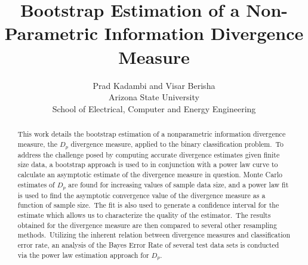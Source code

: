 \documentclass{article}
\begin{document}
	
	\title{Bootstrap Estimation of a Non-Parametric Information Divergence Measure}
	\author { Prad Kadambi and Visar Berisha \\
		\small Arizona State University \\
		\small School of Electrical, Computer and Energy Engineering}
	\date{}
	\maketitle
	
	\begin{abstract}
		
		This work details the bootstrap estimation of a nonparametric information divergence measure, the $D_p$ divergence measure, applied to the binary classification problem.\ To address the challenge posed by computing accurate divergence estimates given finite size data, a bootstrap approach is used to in conjunction with a power law curve to calculate an asymptotic estimate of the divergence measure in question. Monte Carlo estimates of $D_p$ are found for increasing values of sample data size, and a power law fit is used to find the asymptotic convergence value of the divergence measure as a function of sample size.\ The fit is also used to generate a confidence interval for the estimate which allows us to characterize the quality of the estimator.\ The results obtained for the divergence measure are then compared to several other resampling methods.\  Utilizing the inherent relation between divergence measures and classification error rate, an analysis of the Bayes Error Rate of several test data sets is conducted via the power law estimation approach for $D_p$.
	\end{abstract}
\end{document}
